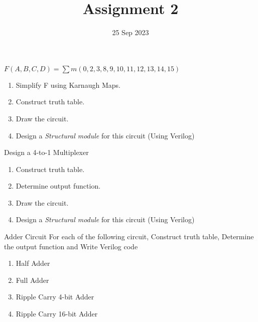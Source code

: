 \documentclass{vhdl-assignment}
\title{Assignment 2}
\date{25 Sep 2023}
\begin{document}
\maketitle
\thispagestyle{fancy}

\begin{problem}{}
    $F(A,B,C,D)=\sum m(0,2,3,8,9,10,11,12,13,14,15)$
    \begin{enumerate}
        \item Simplify F using Karnaugh Maps.
        \item Construct truth table.
        \item Draw the circuit.
        \item Design a \emph{Structural module} for this circuit (Using Verilog)
    \end{enumerate}
\end{problem}

\begin{problem}{Design a 4-to-1 Multiplexer}
    \begin{enumerate}
        \item Construct truth table.
        \item Determine output function.
        \item Draw the circuit.
        \item Design a \emph{Structural module} for this circuit (Using Verilog)
    \end{enumerate}
\end{problem}

\begin{problem}{Adder Circuit}
    For each of the following circuit, Construct truth table, Determine the output function and Write Verilog code 
    \begin{enumerate}
        \item Half Adder
        \item Full Adder
        \item Ripple Carry 4-bit Adder
        \item Ripple Carry 16-bit Adder
    \end{enumerate}
\end{problem}
\end{document}
